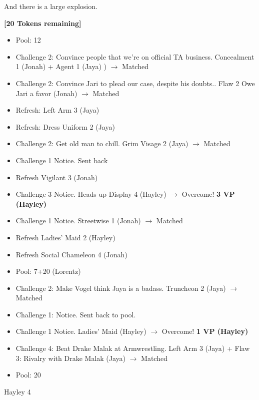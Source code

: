 And there is a large explosion.





\textbf{{[}20 Tokens remaining{]}}





\begin{itemize}[noitemsep,topsep=0pt]
\item Pool: 12
\item Challenge 2: Convince people that we're on official TA business.  Concealment 1 (Jonah) + Agent 1 (Jaya) ) $\rightarrow$ Matched
\item Challenge 2: Convince Jari to plead our case, despite his doubts..  Flaw 2 Owe Jari a favor (Jonah) $\rightarrow$ Matched
\item Refresh: Left Arm 3 (Jaya)
\item Refresh: Dress Uniform 2 (Jaya)
\item Challenge 2: Get old man to chill.  Grim Visage 2 (Jaya) $\rightarrow$ Matched
\item Challenge 1 Notice. Sent back
\item Refresh Vigilant 3 (Jonah)
\item Challenge 3 Notice.  Heads-up Display 4 (Hayley) $\rightarrow$ Overcome! \textbf{3 VP (Hayley)}
\item Challenge 1 Notice.  Streetwise 1 (Jonah) $\rightarrow$ Matched
\item Refresh Ladies' Maid 2 (Hayley)
\item Refresh Social Chameleon 4 (Jonah)
\item Pool: 7+20 (Lorentz)
\item Challenge 2: Make Vogel think Jaya is a badass.  Truncheon 2 (Jaya) $\rightarrow$ Matched
\item Challenge 1: Notice.  Sent back to pool.
\item Challenge 1 Notice.  Ladies' Maid (Hayley) $\rightarrow$ Overcome! \textbf{1 VP (Hayley)}
\item Challenge 4: Beat Drake Malak at Armwrestling.  Left Arm 3 (Jaya) + Flaw 3: Rivalry with Drake Malak (Jaya) $\rightarrow$ Matched
\item Pool: 20
\end{itemize}


\newpage


Hayley 4

